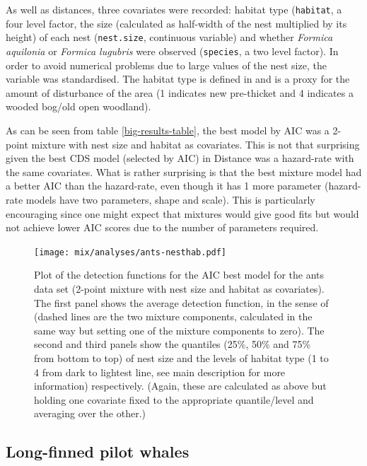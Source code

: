 As well as distances, three covariates were recorded: habitat type (\texttt{habitat}, a four level factor, the size (calculated as half-width of the nest multiplied by its height) of each nest (\texttt{nest.size}, continuous variable) and whether \textit{Formica aquilonia} or \textit{Formica lugubris} were observed (\texttt{species}, a two level factor). In order to avoid numerical problems due to large values of the nest size, the variable was standardised. \label{cor-e17}The habitat type is defined in  and is a proxy for the amount of disturbance of the area (1 indicates new pre-thicket and 4 indicates a wooded bog/old open woodland).

As can be seen from table \ref{big-results-table}, the best model by AIC was a 2-point mixture with nest size and habitat as covariates. This is not that surprising given the best CDS model (selected by AIC) in Distance was a hazard-rate with the same covariates. What is rather surprising is that the best mixture model had a better AIC than the hazard-rate, even though it has 1 more parameter (hazard-rate models have two parameters, shape and scale). This is particularly encouraging since one might expect that mixtures would give good fits but would not achieve lower AIC scores due to the number of parameters required.

\begin{figure}[t]
\centering
\texttt{[image: mix/analyses/ants-nesthab.pdf]}
\caption{Plot of the detection functions for the AIC best model for the ants data set (2-point mixture with nest size and habitat as covariates). The first panel shows the average detection function, in the sense of  (dashed lines are the two mixture components, calculated in the same way but setting one of the mixture components to zero)\label{cor-8s12-2}. The second and third panels show the quantiles (25\%, 50\% and 75\% from bottom to top) of nest size and the levels of habitat type (1 to 4 from dark to lightest line, see main description for more information) respectively. (Again, these are calculated as above but holding one covariate fixed to the appropriate quantile/level and averaging over the other.)\label{cor-r65}}
\label{ants-nesthab}
\end{figure}

\subsection{Long-finned pilot whales}
\label{mix-pilotwhales}


